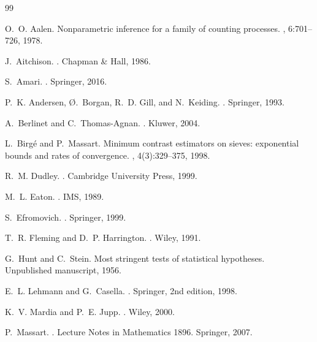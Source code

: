 \documentclass[11pt,twoside,openright]{book}
\theoremstyle{plain}
\theoremstyle{definition}
\theoremstyle{remark}
\begin{document}
\begin{thebibliography}{99}

O.~O. Aalen.
\newblock Nonparametric inference for a family of counting processes.
, 6:701--726, 1978.

J.~Aitchison.
.
\newblock Chapman \& Hall, 1986.

S.~Amari.
.
\newblock Springer, 2016.

P.~K. Andersen, Ø.~Borgan, R.~D. Gill, and N.~Keiding.
.
\newblock Springer, 1993.

A.~Berlinet and C.~Thomas-Agnan.
.
\newblock Kluwer, 2004.

L.~Birg\'e and P.~Massart.
\newblock Minimum contrast estimators on sieves: exponential bounds and rates of convergence.
, 4(3):329--375, 1998.

R.~M. Dudley.
.
\newblock Cambridge University Press, 1999.

M.~L. Eaton.
.
\newblock IMS, 1989.

S.~Efromovich.
.
\newblock Springer, 1999.

T.~R. Fleming and D.~P. Harrington.
.
\newblock Wiley, 1991.

G.~Hunt and C.~Stein.
\newblock Most stringent tests of statistical hypotheses.
\newblock Unpublished manuscript, 1956.

E.~L. Lehmann and G.~Casella.
.
\newblock Springer, 2nd edition, 1998.

K.~V. Mardia and P.~E. Jupp.
.
\newblock Wiley, 2000.

P.~Massart.
.
\newblock Lecture Notes in Mathematics 1896. Springer, 2007.


\end{thebibliography}
\end{document}
